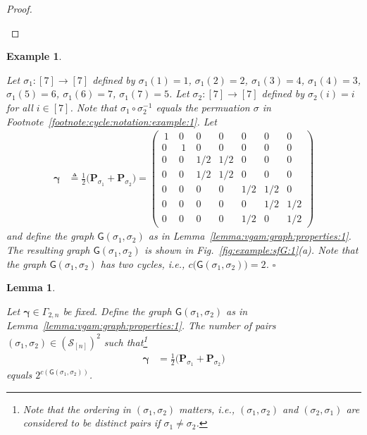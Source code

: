 \documentclass[journal,lettersize,twocolumn]{IEEEtran} %
\newtheorem{lemma}[theorem]{Lemma}
\newtheorem{example}[theorem]{Example}
\newcommand{\eexample}{\hfill$\square$}
\newcommand{\vect}[1]{ \bm{#1} }
\newcommand{\set}[1]{\mathcal{#1}}
\newcommand{\vgam}{ \vect{\gamma} }
\newcommand{\matr}[1]{ \bm{#1} }
\newcommand{\defeq}{ \triangleq }
\newcommand{\setS}{\set{S}}
\newcommand{\mP}{\matr{P}}
\newcommand{\sfG}{\mathsf{G}}
\newcommand{\Gamtwon}{ \Gamma_{2,n} }
\newcommand{\ie}{\textit{i.e.}}
\begin{document}
\begin{appendices}
\begin{proof}
\begin{itemize}
  \end{itemize}
\end{proof}

%

\begin{example}
  \label{example:sfG:1}

  Let $\sigma_1: [7] \to [7]$ defined by $\sigma_1(1) = 1$, $\sigma_1(2) = 2$,
  $\sigma_1(3) = 4$, $\sigma_1(4) = 3$, $\sigma_1(5) = 6$, $\sigma_1(6) = 7$,
  $\sigma_1(7) = 5$. Let $\sigma_2: [7] \to [7]$ defined by $\sigma_2(i) = i$
  for all $i \in [7]$. Note that $\sigma_1 \circ \sigma_2^{-1}$ equals the
  permuation $\sigma$ in Footnote~\ref{footnote:cycle:notation:example:1}. Let
  \begin{align}
    \vgam
      &\defeq
         \frac{1}{2} 
         \bigl( 
           \mP_{\sigma_1} \! + \! \mP_{\sigma_2} 
          \bigr)
       = \left(
           \begin{smallmatrix}
             \ 1 \  & 0     & 0   & 0   & 0   & 0   & 0   \\
             0      & \ 1 \ & 0   & 0   & 0   & 0   & 0   \\
             0      & 0     & 1/2 & 1/2 & 0   & 0   & 0   \\
             0      & 0     & 1/2 & 1/2 & 0   & 0   & 0   \\
             0      & 0     & 0   & 0   & 1/2 & 1/2 & 0   \\
             0      & 0     & 0   & 0   & 0   & 1/2 & 1/2 \\
             0      & 0     & 0   & 0   & 1/2 & 0   & 1/2
           \end{smallmatrix}
         \right)
           \label{eq:example:sfG:1:gamma:1}
  \end{align}
  and define the graph $\sfG(\sigma_1,\sigma_2)$ as in
  Lemma~\ref{lemma:vgam:graph:properties:1}. The resulting graph
  $\sfG(\sigma_1,\sigma_2)$ is shown in Fig.~\ref{fig:example:sfG:1}(a). Note
  that the graph $\sfG(\sigma_1,\sigma_2)$ has two cycles, \ie,
  $c\bigl( \sfG(\sigma_1,\sigma_2) \bigr) = 2$.
  \eexample
\end{example}

%

\begin{lemma}
  \label{lemma:sfGtwo:properties:1}

  Let $\vgam \in \Gamtwon$ be fixed. Define the graph
  $\sfG(\sigma_1,\sigma_2)$ as in
  Lemma~\ref{lemma:vgam:graph:properties:1}. The number of pairs
  $(\sigma_1, \sigma_2) \in (\setS_{[n]})^2$ such that\footnote{Note that the
    ordering in $(\sigma_1, \sigma_2)$ matters, \ie, $(\sigma_1, \sigma_2)$
    and $(\sigma_2, \sigma_1)$ are considered to be distinct pairs if
    $\sigma_1 \neq \sigma_2$.}
  \begin{align*}
    \vgam
      &= \frac{1}{2} 
         \bigl( 
           \mP_{\sigma_1} \! + \! \mP_{\sigma_2} 
          \bigr)
  \end{align*}
  equals $2^{c(\sfG(\sigma_1,\sigma_2))}$.
\end{lemma}


\end{appendices}
\end{document}
